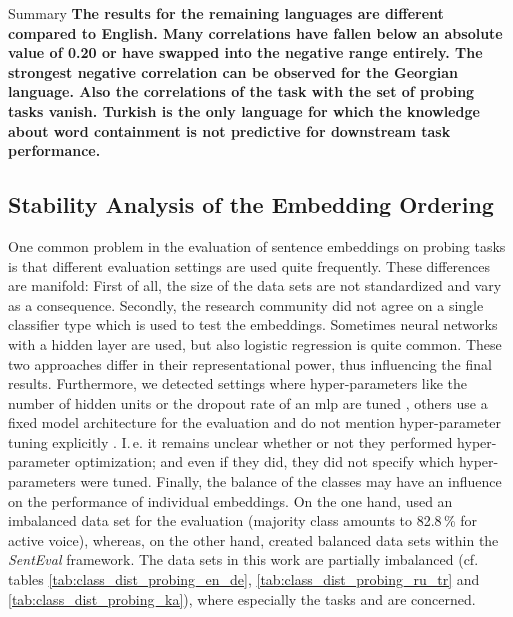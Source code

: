 \vspace*{2mm}
\begin{tudbox}{Summary}
	\textbf{The results for the remaining languages are different compared to English. Many correlations have fallen below an absolute value of 0.20 or have swapped into the negative range entirely. The strongest negative correlation can be observed for the Georgian language. Also the correlations of the  task with the set of probing tasks vanish. Turkish is the only language for which the knowledge about word containment is not predictive for downstream task performance.}
\end{tudbox}

\newpage
\subsection{Stability Analysis of the Embedding Ordering}
\label{sec:stability_analysis}

One common problem in the evaluation of sentence embeddings on probing tasks is that different evaluation settings are used quite frequently. These differences are manifold: First of all, the size of the data sets are not standardized and vary as a consequence. Secondly, the research community did not agree on a single classifier type which is used to test the embeddings. Sometimes neural networks with a hidden layer are used, but also logistic regression is quite common. These two approaches differ in their representational power, thus influencing the final results. Furthermore, we detected settings where hyper-parameters like the number of hidden units or the dropout rate of an \gls{mlp} are tuned \citep{Conneau.2018a}, others use a fixed model architecture for the evaluation and do not mention hyper-parameter tuning explicitly \citep{Perone.2018}. I.\,e. it remains unclear whether or not they performed hyper-parameter optimization; and even if they did, they did not specify which hyper-parameters were tuned. Finally, the balance of the classes may have an influence on the performance of individual embeddings. On the one hand, \citep{Shi.2016} used an imbalanced  data set for the evaluation (majority class amounts to 82.8\,\% for active voice), whereas, on the other hand, \citep{Conneau.2018a} created balanced data sets within the \textit{SentEval} framework. The data sets in this work are partially imbalanced (cf. tables \vref{tab:class_dist_probing_en_de}, \vref{tab:class_dist_probing_ru_tr} and \vref{tab:class_dist_probing_ka}), where especially the tasks  and  are concerned.

